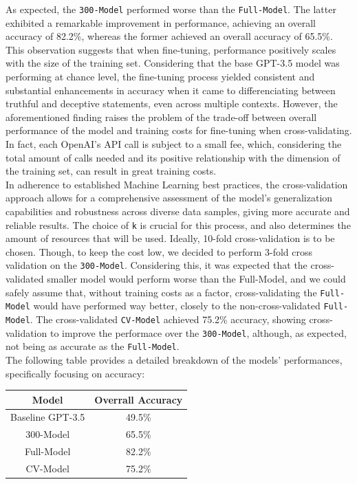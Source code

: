 \documentclass[10pt,twocolumn,letterpaper]{article}
\begin{document}
As expected, the \texttt{300-Model} performed worse than the \texttt{Full-Model}. The latter exhibited a 
remarkable improvement in performance, achieving an overall accuracy of 82.2\%, whereas the former achieved an overall accuracy of 65.5\%.
This observation suggests that when fine-tuning, performance positively scales with the size
of the training set. Considering that the base GPT-3.5 model was performing at chance level, the fine-tuning process
yielded consistent and substantial enhancements in accuracy when it came to differenciating
between truthful and deceptive statements, even across multiple contexts. 
However, the aforementioned finding raises the problem of the trade-off between overall performance of the model
and training costs for fine-tuning when cross-validating. In fact, each OpenAI's API call is subject to a small fee, which, considering 
the total amount of calls needed and its positive relationship with the dimension of the training set, can result in great training costs. \\

In adherence to established Machine Learning best practices, the cross-validation approach allows for a comprehensive assessment 
of the model's generalization capabilities and robustness across diverse data samples, giving more accurate and reliable results. The choice of \texttt{k} 
is crucial for this process, and also determines the amount of resources that will be used. Ideally, 10-fold cross-validation is to be chosen.
Though, to keep the cost low, we decided to perform 3-fold cross validation on the \texttt{300-Model}. Considering this, it was expected that the cross-validated
smaller model would perform worse than the Full-Model, and we could safely assume that, without training costs as a factor, cross-validating the \texttt{Full-Model}
would have performed way better, closely to the non-cross-validated \texttt{Full-Model}.
The cross-validated \texttt{CV-Model} achieved 75.2\% accuracy, showing cross-validation to improve the performace over the \texttt{300-Model},
although, as expected, not being as accurate as the \texttt{Full-Model}. \\

The following table provides a detailed breakdown of the models' performances,
specifically focusing on accuracy:

\begin{center}

    \begin{tabular}{cc}
        \toprule
        Model & Overrall Accuracy \\
        \midrule
        Baseline GPT-3.5  & 49.5\% \\
        \midrule
        300-Model & 65.5\% \\
        \midrule
        Full-Model & 82.2\% \\
         \midrule
        CV-Model & 75.2\% \\
        \bottomrule
    \end{tabular}
    
\end{center}
\end{document}
